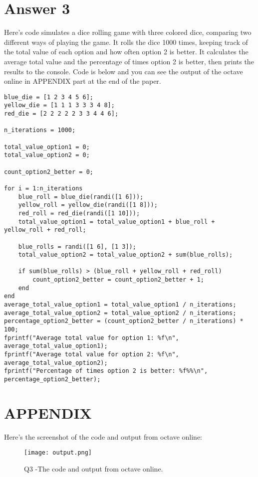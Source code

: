 \documentclass[12pt]{article}
\begin{document}
\section*{Answer 3}
Here's  code simulates a dice rolling game with three colored dice, comparing two different ways of playing the game. It rolls the dice 1000 times, keeping track of the total value of each option and how often option 2 is better. It calculates the average total value and the percentage of times option 2 is better, then prints the results to the console. Code is below and you can see the  output of the octave online in APPENDIX part at the end of the paper.
\begin{lstlisting}
blue_die = [1 2 3 4 5 6];
yellow_die = [1 1 1 3 3 3 4 8];
red_die = [2 2 2 2 2 3 3 4 4 6];

n_iterations = 1000;

total_value_option1 = 0;
total_value_option2 = 0;

count_option2_better = 0;

for i = 1:n_iterations
    blue_roll = blue_die(randi([1 6]));
    yellow_roll = yellow_die(randi([1 8]));
    red_roll = red_die(randi([1 10]));
    total_value_option1 = total_value_option1 + blue_roll + yellow_roll + red_roll;
    
    blue_rolls = randi([1 6], [1 3]);
    total_value_option2 = total_value_option2 + sum(blue_rolls);

    if sum(blue_rolls) > (blue_roll + yellow_roll + red_roll)
        count_option2_better = count_option2_better + 1;
    end
end
average_total_value_option1 = total_value_option1 / n_iterations;
average_total_value_option2 = total_value_option2 / n_iterations;
percentage_option2_better = (count_option2_better / n_iterations) * 100;
fprintf("Average total value for option 1: %f\n", average_total_value_option1);
fprintf("Average total value for option 2: %f\n", average_total_value_option2);
fprintf("Percentage of times option 2 is better: %f%%\n", percentage_option2_better);
\end{lstlisting}
\newpage
\section*{APPENDIX}

Here's the screenshot of the code and output from octave online:

\begin{figure}[h]
\centering
\texttt{[image: output.png]}
\caption{Q3 -The code and output from octave online.}
\label{fig:image}
\end{figure}
\end{document}
